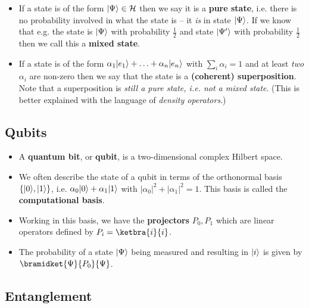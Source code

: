 \documentclass[10pt]{article}
\DeclarePairedDelimiter\ket{\lvert}{\rangle}
\newcommand{\hilb}{\mathcal{H}}
\begin{document}
\begin{itemize}
                \item If a state is of the form $\ket{\Psi}\in\hilb$ then we say it is a \textbf{pure state}, i.e. there is no probability involved in what the state is -- it \emph{is} in state $\ket{\Psi}$.
                    If we know that e.g. the state is $\ket{\Psi}$ with probability $\frac12$ and state $\ket{\Psi'}$ with probability $\frac12$ then we call this a \textbf{mixed state}.
                \item If a state is of the form $\alpha_1\ket{e_1}+\ldots+\alpha_n\ket{e_n}$ with $\sum_i\alpha_i=1$ and at least \emph{two} $\alpha_i$ are non-zero then we say that the state is a \textbf{(coherent) superposition}.
                    Note that a superposition is \emph{still a pure state, i.e. not a mixed state}.
                    (This is better explained with the language of \emph{density operators}.)
            \end{itemize}

        \subsection{Qubits}

            \begin{itemize}
                \item A \textbf{quantum bit}, or \textbf{qubit}, is a two-dimensional complex Hilbert space.
                \item We often describe the state of a qubit in terms of the orthonormal basis $\{\ket{0},\ket{1}\}$, i.e. $\alpha_0\ket{0}+\alpha_1\ket{1}$ with $|\alpha_0|^2+|\alpha_1|^2=1$.
                    This basis is called the \textbf{computational basis}.
                \item Working in this basis, we have the \textbf{projectors} $P_0,P_1$ which are linear operators defined by $P_i=\ketbra{i}{i}$.
                \item The probability of a state $\ket{\Psi}$ being measured and resulting in $\ket{i}$ is given by $\bramidket{\Psi}{P_0}{\Psi}$.
            \end{itemize}

        \subsection{Entanglement}
\end{document}
